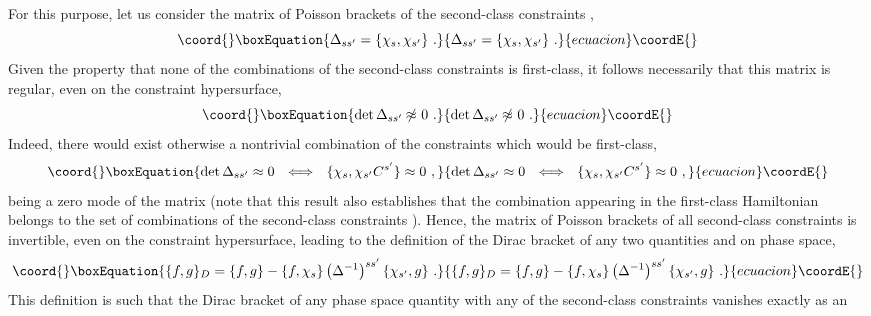 \documentclass[a4paper,11pt]{article}
\begin{document}
For this purpose, let us consider the matrix of Poisson brackets of the
second-class constraints \coordHE{},
\begin{equation}\coord{}\boxEquation{
\Delta_{ss'}=\{\chi_s,\chi_{s'}\}\ .
}{
\Delta_{ss'}=\{\chi_s,\chi_{s'}\}\ .
}{ecuacion}\coordE{}\end{equation}
Given the property that none of the combinations of the second-class
constraints \coordHE{} is first-class, it follows necessarily that this
matrix is regular, even on the constraint hypersurface,
\begin{equation}\coord{}\boxEquation{
{\rm det}\,\Delta_{ss'}\not{\!\!\approx}\ 0\ .
}{
{\rm det}\,\Delta_{ss'}\not{\!\!\approx}\ 0\ .
}{ecuacion}\coordE{}\end{equation}
Indeed, there would exist otherwise a nontrivial combination \coordHE{}
of the constraints \coordHE{} which would be first-class,
\begin{equation}\coord{}\boxEquation{
{\rm det}\,\Delta_{ss'}\approx 0\ \ 
\Longleftrightarrow\ \ \{\chi_s,\chi_{s'}C^{s'}\}\approx 0\ ,
}{
{\rm det}\,\Delta_{ss'}\approx 0\ \ 
\Longleftrightarrow\ \ \{\chi_s,\chi_{s'}C^{s'}\}\approx 0\ ,
}{ecuacion}\coordE{}\end{equation}
\myHighlight{$C^s$}\coordHE{} being a zero mode of the matrix \coordHE{}
(note that this result also establishes that the combination \coordHE{}
appearing in the first-class Hamiltonian \myHighlight{$H$}\coordHE{} belongs to the set of
combinations of the second-class constraints \coordHE{}).
Hence, the matrix of Poisson brackets of all second-class constraints
\myHighlight{$\chi_s$}\coordHE{} is invertible, even on the constraint hypersurface, leading
to the definition of the Dirac bracket \myHighlight{$\{f,g\}_D$}\coordHE{} of any two quantities
\myHighlight{$f(q^n,p_n)$}\coordHE{} and \myHighlight{$g(q^n,p_n)$}\coordHE{} on phase space,
\begin{equation}\coord{}\boxEquation{
\{f,g\}_D=\{f,g\}-\{f,\chi_s\}\left(\Delta^{-1}\right)^{ss'}
\{\chi_{s'},g\}\ .
}{
\{f,g\}_D=\{f,g\}-\{f,\chi_s\}\left(\Delta^{-1}\right)^{ss'}
\{\chi_{s'},g\}\ .
}{ecuacion}\coordE{}\end{equation}
This definition is such that the Dirac bracket of any phase space quantity \coordHE{}
with any of the second-class constraints \coordHE{} vanishes exactly as an
\end{document}
